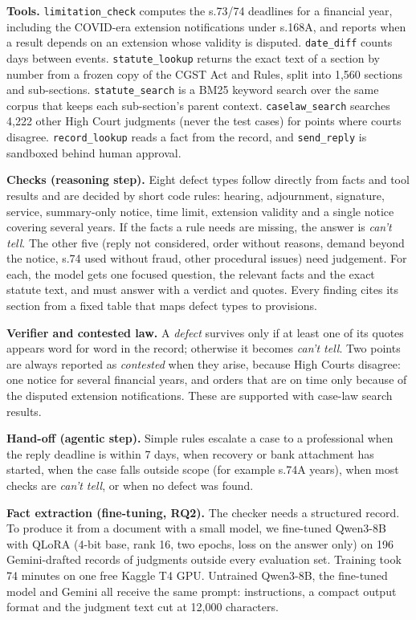 \documentclass[10pt,a4paper]{article}
\newcommand{\code}[1]{\texttt{#1}}
\begin{document}
\textbf{Tools.} \code{limitation\_check} computes the s.73/74 deadlines for a financial year, including the COVID-era extension notifications under s.168A, and reports when a result depends on an extension whose validity is disputed. \code{date\_diff} counts days between events. \code{statute\_lookup} returns the exact text of a section by number from a frozen copy of the CGST Act and Rules, split into 1,560 sections and sub-sections. \code{statute\_search} is a BM25 keyword search \cite{bm25} over the same corpus that keeps each sub-section's parent context. \code{caselaw\_search} searches 4,222 other High Court judgments (never the test cases) for points where courts disagree. \code{record\_lookup} reads a fact from the record, and \code{send\_reply} is sandboxed behind human approval.

\textbf{Checks (reasoning step).} Eight defect types follow directly from facts and tool results and are decided by short code rules: hearing, adjournment, signature, service, summary-only notice, time limit, extension validity and a single notice covering several years. If the facts a rule needs are missing, the answer is \emph{can't tell}. The other five (reply not considered, order without reasons, demand beyond the notice, s.74 used without fraud, other procedural issues) need judgement. For each, the model gets one focused question, the relevant facts and the exact statute text, and must answer with a verdict and quotes. Every finding cites its section from a fixed table that maps defect types to provisions.

\textbf{Verifier and contested law.} A \emph{defect} survives only if at least one of its quotes appears word for word in the record; otherwise it becomes \emph{can't tell}. Two points are always reported as \emph{contested} when they arise, because High Courts disagree: one notice for several financial years, and orders that are on time only because of the disputed extension notifications. These are supported with case-law search results.

\textbf{Hand-off (agentic step).} Simple rules escalate a case to a professional when the reply deadline is within 7 days, when recovery or bank attachment has started, when the case falls outside scope (for example s.74A years), when most checks are \emph{can't tell}, or when no defect was found.

\textbf{Fact extraction (fine-tuning, RQ2).} The checker needs a structured record. To produce it from a document with a small model, we fine-tuned Qwen3-8B with QLoRA (4-bit base, rank 16, two epochs, loss on the answer only) on 196 Gemini-drafted records of judgments outside every evaluation set. Training took 74 minutes on one free Kaggle T4 GPU. Untrained Qwen3-8B, the fine-tuned model and Gemini all receive the same prompt: instructions, a compact output format and the judgment text cut at 12,000 characters.
\end{document}
